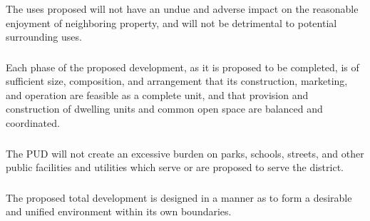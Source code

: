 \subsubsection{}
The uses proposed will not have an undue and adverse impact on the reasonable enjoyment of neighboring property, and will not be detrimental to potential surrounding uses.
\subsubsection{}
\subsubsection{}
Each phase of the proposed development, as it is proposed to be completed, is of sufficient size, composition, and arrangement that its construction, marketing, and operation are feasible as a complete unit, and that provision and construction of dwelling units and common open space are balanced and coordinated.
\subsubsection{}
The PUD will not create an excessive burden on parks, schools, streets, and other public facilities and utilities which serve or are proposed to serve the district.
\subsubsection{}
The proposed total development is designed in a manner as to form a desirable and unified environment within its own boundaries.

